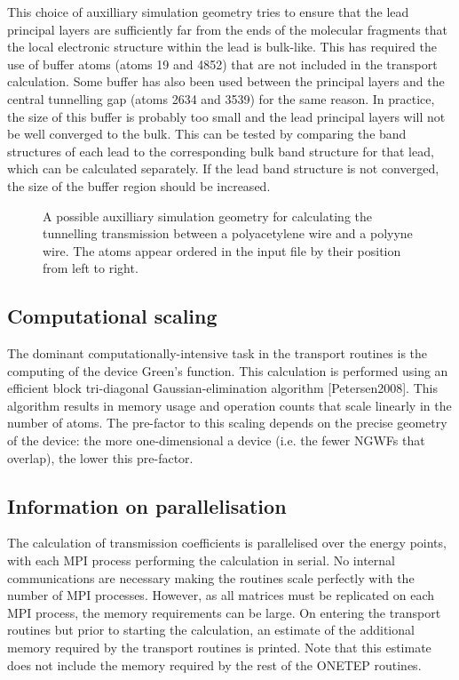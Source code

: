\documentclass[letterpaper,10pt,english]{sphinxmanual}
\begin{document}
This choice of auxilliary simulation geometry tries to ensure that the
lead principal layers are sufficiently far from the ends of the
molecular fragments that the local electronic structure within the lead
is bulk-like. This has required the use of buffer atoms (atoms 1\textendash{}9 and
48\textendash{}52) that are not included in the transport calculation. Some buffer
has also been used between the principal layers and the central
tunnelling gap (atoms 26\textendash{}34 and 35\textendash{}39) for the same reason. In practice,
the size of this buffer is probably too small and the lead principal
layers will not be well converged to the bulk. This can be tested by
comparing the band structures of each lead to the corresponding bulk
band structure for that lead, which can be calculated separately. If the
lead band structure is not converged, the size of the buffer region
should be increased.

\begin{figure}[htbp]
\centering
\capstart

\noindent{}
\caption{A possible auxilliary simulation geometry for calculating the tunnelling transmission between a polyacetylene wire and a polyyne wire. The atoms appear ordered in the input file by their position from left to right.}\label{\detokenize{transport:fig1}}\label{\detokenize{transport:id15}}\end{figure}


\subsection{Computational scaling}
\label{\detokenize{transport:computational-scaling}}
The dominant computationally-intensive task in the transport routines is
the computing of the device Green’s function. This calculation is
performed using an efficient block tri-diagonal Gaussian-elimination
algorithm {[}Petersen2008{]}. This algorithm results in memory
usage and operation counts that scale linearly in the number of atoms.
The pre-factor to this scaling depends on the precise geometry of the
device: the more one-dimensional a device (i.e. the fewer NGWFs that
overlap), the lower this pre-factor.


\subsection{Information on parallelisation}
\label{\detokenize{transport:information-on-parallelisation}}
The calculation of transmission coefficients is parallelised over the
energy points, with each MPI process performing the calculation in
serial. No internal communications are necessary making the routines
scale perfectly with the number of MPI processes. However, as all
matrices must be replicated on each MPI process, the memory requirements
can be large. On entering the transport routines but prior to starting
the calculation, an estimate of the additional memory required by the
transport routines is printed. Note that this estimate does not include
the memory required by the rest of the ONETEP routines.
\end{document}
